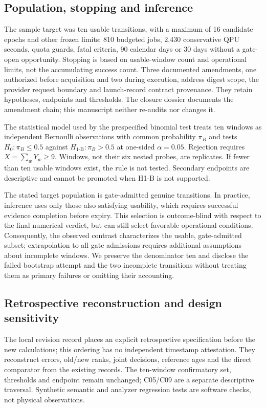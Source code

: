 \documentclass[pdflatex,sn-mathphys-num]{sn-jnl}
\begin{document}
\subsection{Population, stopping and inference}
The sample target was ten usable transitions, with a maximum of 16 candidate epochs and other frozen limits: 810 budgeted jobs, 2,430 conservative QPU seconds, quota guards, fatal criteria, 90 calendar days or 30 days without a gate-open opportunity. Stopping is based on usable-window count and operational limits, not the accumulating success count. Three documented amendments, one authorized before acquisition and two during execution, address digest scope, the provider request boundary and launch-record contract provenance. They retain hypotheses, endpoints and thresholds. The closure dossier documents the amendment chain; this manuscript neither re-audits nor changes it.

The statistical model used by the prespecified binomial test treats ten windows as independent Bernoulli observations with common probability $\pi_B$ and tests $H_0:\pi_B\leq0.5$ against $H_{1\text{-B}}:\pi_B>0.5$ at one-sided $\alpha=0.05$. Rejection requires $X=\sum_wY_w\geq9$. Windows, not their six nested probes, are replicates. If fewer than ten usable windows exist, the rule is not tested. Secondary endpoints are descriptive and cannot be promoted when H1-B is not supported.

The stated target population is gate-admitted genuine transitions. In practice, inference uses only those also satisfying usability, which requires successful evidence completion before expiry. This selection is outcome-blind with respect to the final numerical verdict, but can still select favorable operational conditions. Consequently, the observed contrast characterizes the usable, gate-admitted subset; extrapolation to all gate admissions requires additional assumptions about incomplete windows. We preserve the denominator ten and disclose the failed bootstrap attempt and the two incomplete transitions without treating them as primary failures or omitting their accounting.

\subsection{Retrospective reconstruction and design sensitivity}
The local revision record places an explicit retrospective specification before the new calculations; this ordering has no independent timestamp attestation. They reconstruct errors, old/new ranks, joint decisions, reference ages and the direct comparator from the existing records. The ten-window confirmatory set, thresholds and endpoint remain unchanged; C05/C09 are a separate descriptive traversal. Synthetic semantic and analyzer regression tests are software checks, not physical observations.
\end{document}
